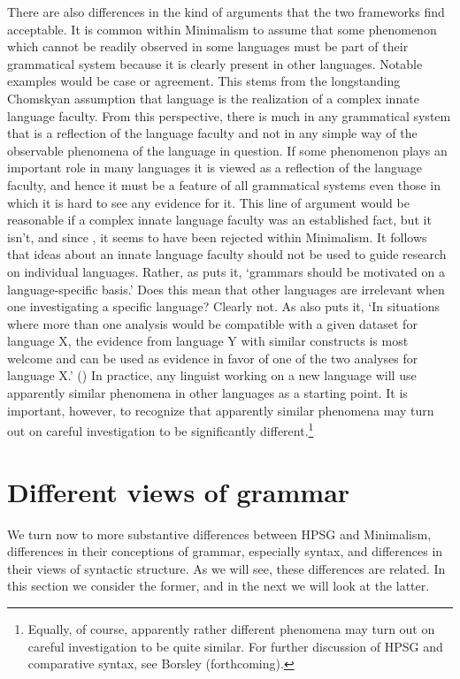 \documentclass[output=paper]{langsci/langscibook}
\begin{document}
There are also differences in the kind of arguments that the two frameworks find acceptable. It is
common within Minimalism to assume that some phenomenon which cannot be readily observed in some
languages must be part of their grammatical system because it is clearly present in other
languages. Notable examples would be case or agreement. This stems from the longstanding Chomskyan
assumption that language is the realization of a complex innate language faculty. From this
perspective, there is much in any grammatical system that is a reflection of the language faculty
and not in any simple way of the observable phenomena of the language in question. If some
phenomenon plays an important role in many languages it is viewed as a reflection of the language
faculty, and hence it must be a feature of all grammatical systems even those in which it is hard to
see any evidence for it. This line of argument would be reasonable if a complex innate language
faculty was an established fact, but it isn't, and since \citet*{HCF2002a}, it seems to have been
rejected within Minimalism.  It follows that ideas about an innate language faculty should not be
used to guide research on individual languages. Rather, as \citet[25]{MuellerCoreGram} puts it,
`grammars should be motivated on a language-specific basis.' Does this mean that other languages are
irrelevant when one investigating a specific language? Clearly not. As 
also puts it, `In situations where more than one analysis would be compatible with a given dataset
for language X, the evidence from language Y with similar constructs is most welcome and can be used
as evidence in favor of one of the two analyses for language X.' (\citeyear[43]{MuellerCoreGram}) In
practice, any linguist working on a new language will use apparently similar phenomena in other
languages as a starting point. It is important, however, to recognize that apparently similar
phenomena may turn out on careful investigation to be significantly different.\footnote{%
  Equally, of course, apparently rather different phenomena may turn out on careful investigation to
  be quite similar. For further discussion of HPSG and comparative syntax, see Borsley
  (forthcoming).%
} 

\section{Different views of grammar}
\label{sec:min-views-grammar}
We turn now to more substantive differences between HPSG and Minimalism, differences in their conceptions of grammar, especially syntax, and differences in their views of syntactic structure. As we will see, these differences are related. In this section we consider the former, and in the next we will look at the latter.
\end{document}
